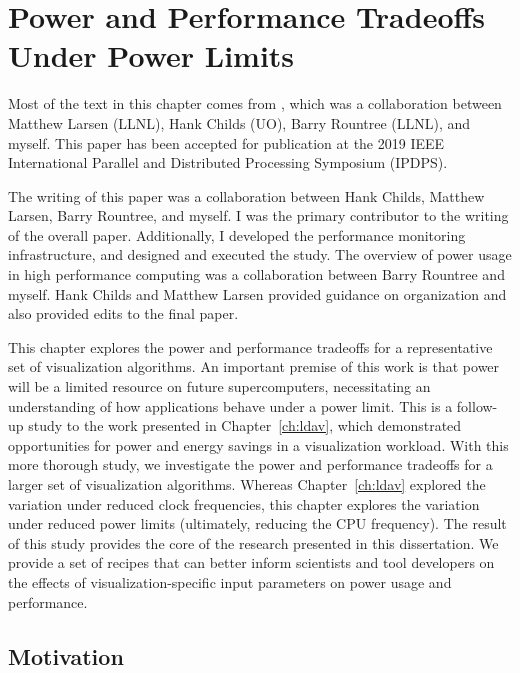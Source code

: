 \chapter{Power and Performance Tradeoffs Under Power Limits}
\label{ch:ipdps}

Most of the text in this chapter comes from \cite{ipdps2019.toappear}, which
was a collaboration between Matthew Larsen (LLNL), Hank Childs (UO), Barry
Rountree (LLNL), and myself.
%
This paper has been accepted for publication at the 2019 IEEE International
Parallel and Distributed Processing Symposium (IPDPS).

The writing of this paper was a collaboration between Hank Childs, Matthew
Larsen, Barry Rountree, and myself.
%
I was the primary contributor to the writing of the overall paper.
%
Additionally, I developed the performance monitoring infrastructure, and
designed and executed the study.
%
The overview of power usage in high performance computing was a collaboration
between Barry Rountree and myself.
%
Hank Childs and Matthew Larsen provided guidance on organization and also
provided edits to the final paper.

This chapter explores the power and performance tradeoffs for a representative
set of visualization algorithms.
%
An important premise of this work is that power will be a limited resource on
future supercomputers, necessitating an understanding of how applications
behave under a power limit.
%
This is a follow-up study to the work presented in Chapter~\ref{ch:ldav}, which
demonstrated opportunities for power and energy savings in a visualization
workload.
%
With this more thorough study, we investigate the power and performance
tradeoffs for a larger set of visualization algorithms.
%
Whereas Chapter~\ref{ch:ldav} explored the variation under reduced clock
frequencies, this chapter explores the variation under reduced power limits
(ultimately, reducing the CPU frequency).
%
The result of this study provides the core of the research presented in this
dissertation.
%
We provide a set of recipes that can better inform scientists and tool
developers on the effects of visualization-specific input parameters on power
usage and performance.

\section{Motivation}


